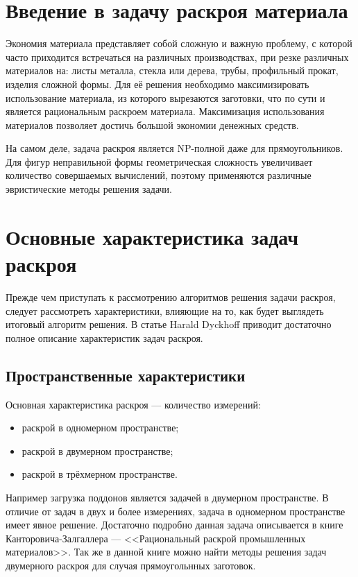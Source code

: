 \documentclass[14pt]{extarticle}
\begin{document}
	\section{Введение в задачу раскроя материала}
	Экономия материала представляет собой сложную и важную проблему, с которой
	часто приходится встречаться на различных производствах, при резке различных материалов на: листы металла, стекла или дерева, трубы, профильный прокат, изделия сложной формы. Для её решения необходимо максимизировать использование материала, из которого вырезаются заготовки, что по сути и является рациональным раскроем материала. Максимизация использования материалов позволяет достичь большой экономии денежных средств.
	
	
	На самом деле, задача раскроя является NP-полной даже для прямоугольников. Для
	фигур неправильной формы геометрическая сложность увеличивает количество совершаемых вычислений, поэтому применяются различные эвристические методы решения задачи.
	\section{Основные характеристика задач раскроя}
	Прежде чем приступать к рассмотрению алгоритмов решения задачи раскроя, следует рассмотреть характеристики, влияющие на то, как будет выглядеть итоговый алгоритм решения. В статье \cite{Dyckhoff} Harald Dyckhoff приводит достаточно полное описание характеристик задач раскроя.
	\subsection{Пространственные характеристики}
	Основная характеристика раскроя --- количество измерений:
	\begin{itemize}
		\item раскрой в одномерном пространстве;
		\item раскрой в двумерном пространстве;
		\item раскрой в трёхмерном пространстве.
	\end{itemize}


	Например загрузка поддонов является задачей в двумерном пространстве. В отличие от 	задач в двух и более измерениях, задача в одномерном пространстве имеет явное решение. Достаточно подробно данная задача описывается в книге \cite{Cantorovich} Канторовича-Залгаллера --- <<Рациональный раскрой промышленных материалов>>. Так же в данной книге можно найти методы решения задач двумерного раскроя для случая прямоугольнных заготовок.
\end{document}
